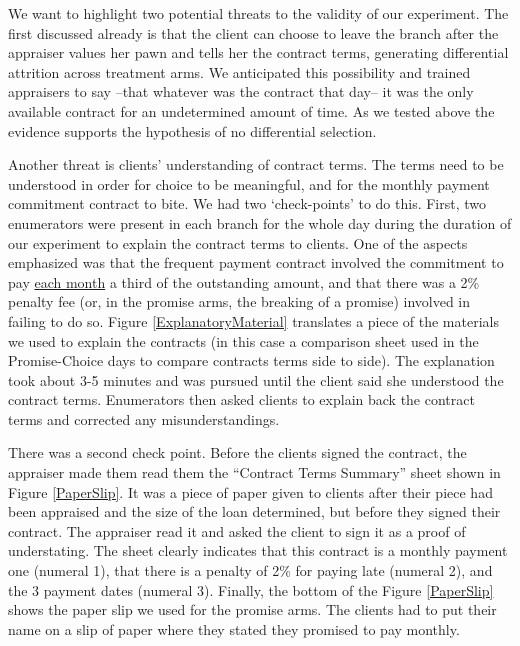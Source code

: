 \documentclass[oneside,11pt]{article}
\begin{document}
We want to highlight two potential threats to the validity of our experiment. The first discussed already is that the client can choose to leave the branch after the appraiser values her pawn and tells her the contract terms, generating differential attrition across treatment arms. We anticipated this possibility and trained appraisers to say --that whatever was the contract that day-- it was the only available contract for an undetermined amount of time. As we tested above the evidence supports the hypothesis of no differential selection. %

Another threat is clients' understanding of contract terms. The terms need to be understood in order for choice to be meaningful, and for the monthly payment commitment contract to bite. We had two `check-points' to do this. First, two enumerators were present in each branch for the whole day during the duration of our experiment to explain the contract terms to clients. One of the aspects emphasized was that the frequent payment contract involved the commitment to pay \underline{each month} a third of the outstanding amount, and that there was a 2\% penalty fee (or, in the promise arms, the breaking of a promise) involved in failing to do so.  Figure \ref{ExplanatoryMaterial} translates a piece of the materials we used to explain the contracts (in this case a comparison sheet used in the Promise-Choice days to compare contracts terms side to side). The explanation took about 3-5 minutes and was pursued until the client said she understood the contract terms. Enumerators then asked clients to explain back the contract terms and corrected any misunderstandings. 

There was a second check point. Before the clients signed the contract, the appraiser made them read them the ``Contract Terms Summary'' sheet shown in Figure \ref{PaperSlip}. It was a piece of paper given to clients after their piece had been appraised and the size of the loan determined, but before they signed their contract. The appraiser read it and asked the client to sign it as a proof of understating. The sheet clearly indicates that this contract is a monthly payment one (numeral 1), that there is a penalty of 2\% for paying late (numeral 2), and the 3 payment dates (numeral 3). Finally, the bottom of the Figure \ref{PaperSlip} shows the paper slip we used for the promise arms. The clients had to put their name on a slip of paper where they stated they promised to pay monthly.
\end{document}

